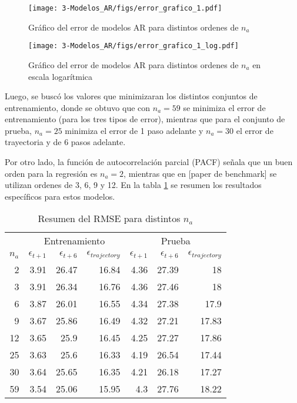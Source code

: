 \begin{figure}[H]
	\centering
	\texttt{[image: 3-Modelos\_AR/figs/error\_grafico\_1.pdf]}
	\caption{Gráfico del error de modelos AR para distintos ordenes de $n_a$}
	\label{fig:M3_iter_graficos_error}
\end{figure}

\begin{figure}[H]
	\centering
	\texttt{[image: 3-Modelos\_AR/figs/error\_grafico\_1\_log.pdf]}
	\caption{Gráfico del error de modelos AR para distintos ordenes de $n_a$ en escala logarítmica}
	\label{fig:M3_iter_graficos_error_log}
\end{figure}

Luego, se buscó los valores que minimizaran los distintos conjuntos de entrenamiento, donde se obtuvo que con $n_a=59$ se minimiza el error de entrenamiento (para los tres tipos de error), mientras que para el conjunto de prueba, $n_a=25$ minimiza el error de 1 paso adelante y $n_a=30$ el error de trayectoria y de 6 pasos adelante.

Por otro lado, la función de autocorrelación parcial (PACF) señala que un buen orden para la regresión es $n_a=2$, mientras que en [paper de benchmark] se utilizan ordenes de 3, 6, 9 y 12. En la tabla \ref{table:M3_resultados_distintos_na} se resumen los resultados específicos para estos modelos.

\begin{table}[H]
	\centering
	\begin{tabular}{rrrr|rrr}
		\hline \hline
		& \multicolumn{3}{c|}{Entrenamiento} & \multicolumn{3}{c}{Prueba} \\
		$n_a$& $\epsilon_{t+1}$ & $\epsilon_{t+6}$ &$\epsilon_{trajectory}$ & $\epsilon_{t+1}$  & $\epsilon_{t+6}$ & $\epsilon_{trajectory}$ \\ \hline
		2   & 3.91 & 26.47 & 16.84 & 4.36 & 27.39 & 18 \\
		3   & 3.91 & 26.34 & 16.76 & 4.36 & 27.46 & 18 \\
		6   & 3.87 & 26.01 & 16.55 & 4.34 & 27.38 & 17.9 \\
		9   & 3.67 & 25.86 & 16.49 & 4.32 & 27.21 & 17.83 \\
		12  & 3.65 & 25.9 & 16.45 & 4.25 & 27.27 & 17.86 \\
		25  & 3.63 & 25.6 & 16.33 & 4.19 & 26.54 & 17.44 \\
		30  & 3.64 & 25.65 & 16.35 & 4.21 & 26.18 & 17.27 \\
		59  & 3.54 & 25.06 & 15.95 & 4.3 & 27.76 & 18.22 \\
		\hline \hline
	\end{tabular}
	\caption{Resumen del RMSE para distintos $n_a$}
	\label{table:M3_resultados_distintos_na}
\end{table}

